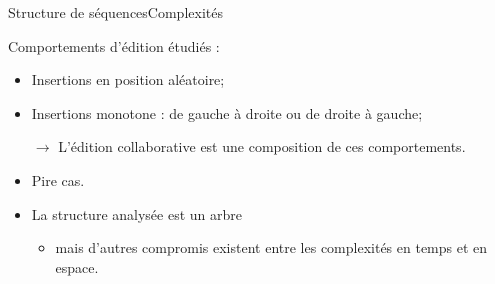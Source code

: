 \begin{frame}{Structure de séquences}{Complexités}

  \hspace{-1cm}
  \begin{minipage}{0.32\textwidth}
    \begin{center}
      
    \end{center}
  \end{minipage}
  \hspace{1.cm}
  \begin{minipage}{0.32\textwidth}
    \begin{center}
      
    \end{center}
  \end{minipage}
  \begin{minipage}{0.32\textwidth}
    \begin{center}
      
    \end{center}
  \end{minipage}

  \vspace{0.5cm}
  
  Comportements d'édition étudiés :
  \begin{itemize}
  \item Insertions en position aléatoire;
  \item Insertions monotone : de gauche à droite ou de droite à gauche;    
  \item [$\rightarrow$] L'édition collaborative est une composition de ces
    comportements.
  \end{itemize}
  
  \begin{itemize}
  \item Pire cas.
  \end{itemize}

  \vspace{0.5cm}
  
  \begin{itemize}
  \item La structure analysée est un arbre 
    \begin{itemize}
    \item mais d'autres compromis existent entre les complexités en temps et en
      espace.
    \end{itemize}
  \end{itemize}

\end{frame}

